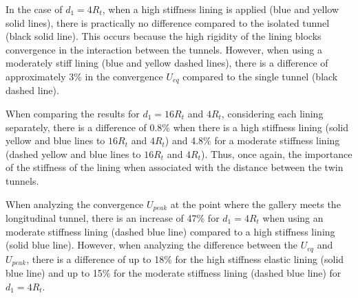 \documentclass[a4paper,fleqn]{cas-sc}
\begin{document}
\FloatBarrier
In the case of $d_1=4R_t$, when a high stiffness lining is applied (blue and yellow solid lines), there is practically no difference compared to the isolated tunnel (black solid line). This occurs because the high rigidity of the lining blocks convergence in the interaction between the tunnels. However, when using a moderately stiff lining (blue and yellow dashed lines), there is a difference of approximately 3\% in the convergence $U_{eq}$ compared to the single tunnel (black dashed line).

When comparing the results for $d_1 = 16R_t$ and $4R_t$, considering each lining separately, there is a difference of 0.8\% when there is a high stiffness lining (solid yellow and blue lines to $16R_t$ and $4R_t$) and 4.8\% for a moderate stiffness lining (dashed yellow and blue lines to $16R_t$ and $4R_t$). Thus, once again, the importance of the stiffness of the lining when associated with the distance between the twin tunnels.

When analyzing the convergence $U_{peak}$ at the point where the gallery meets the longitudinal tunnel, there is an increase of 47\% for $d_1=4R_t$ when using an moderate stiffness lining (dashed blue line) compared to a high stiffness lining (solid blue line). However, when analyzing the difference between the $U_{eq}$ and $U_{peak}$, there is a difference of up to 18\% for the high stiffness elastic lining (solid blue line) and up to 15\% for the moderate stiffness lining (dashed blue line) for $d_1=4R_t$.
\end{document}
